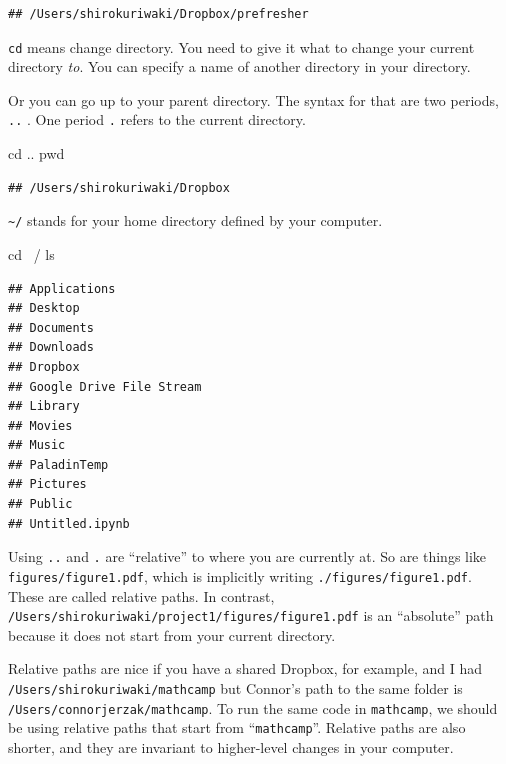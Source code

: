 \documentclass[]{book}
\newenvironment{Shaded}{\begin{snugshade}}{\end{snugshade}}
\newcommand{\FunctionTok}[1]{\textcolor[rgb]{0.00,0.00,0.00}{#1}}
\newcommand{\BuiltInTok}[1]{#1}
\newcommand{\NormalTok}[1]{#1}
\theoremstyle{definition}
\theoremstyle{definition}
\theoremstyle{definition}
\theoremstyle{remark}
\begin{document}
\begin{verbatim}
## /Users/shirokuriwaki/Dropbox/prefresher
\end{verbatim}

\texttt{cd} means change directory. You need to give it what to change
your current directory \emph{to}. You can specify a name of another
directory in your directory.

Or you can go up to your parent directory. The syntax for that are two
periods, \texttt{..} . One period \texttt{.} refers to the current
directory.

\begin{Shaded}
\begin{Highlighting}[]
\BuiltInTok{cd}\NormalTok{ ..}
\BuiltInTok{pwd}
\end{Highlighting}
\end{Shaded}

\begin{verbatim}
## /Users/shirokuriwaki/Dropbox
\end{verbatim}

\texttt{\textasciitilde{}/} stands for your home directory defined by
your computer.

\begin{Shaded}
\begin{Highlighting}[]
\BuiltInTok{cd}\NormalTok{ ~/}
\FunctionTok{ls}
\end{Highlighting}
\end{Shaded}

\begin{verbatim}
## Applications
## Desktop
## Documents
## Downloads
## Dropbox
## Google Drive File Stream
## Library
## Movies
## Music
## PaladinTemp
## Pictures
## Public
## Untitled.ipynb
\end{verbatim}

Using \texttt{..} and \texttt{.} are ``relative'' to where you are
currently at. So are things like \texttt{figures/figure1.pdf}, which is
implicitly writing \texttt{./figures/figure1.pdf}. These are called
relative paths. In contrast,
\texttt{/Users/shirokuriwaki/project1/figures/figure1.pdf} is an
``absolute'' path because it does not start from your current directory.

Relative paths are nice if you have a shared Dropbox, for example, and I
had \texttt{/Users/shirokuriwaki/mathcamp} but Connor's path to the same
folder is \texttt{/Users/connorjerzak/mathcamp}. To run the same code in
\texttt{mathcamp}, we should be using relative paths that start from
``\texttt{mathcamp}''. Relative paths are also shorter, and they are
invariant to higher-level changes in your computer.
\end{document}

